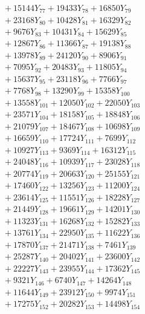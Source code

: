 \documentclass[a4paper,10pt]{article}
\begin{document}
{\begin{align}
&\;  + 15144 Y_{77} + 19433 Y_{78} + 16850 Y_{79} \\[0.3ex]
&\;  + 23168 Y_{80} + 10428 Y_{81} + 16329 Y_{82} \\[0.3ex]
&\;  + 9676 Y_{83} + 10431 Y_{84} + 15629 Y_{85} \\[0.3ex]
&\;  + 12867 Y_{86} + 11366 Y_{87} + 19138 Y_{88} \\[0.5ex]\allowbreak
&\;  + 13978 Y_{89} + 24120 Y_{90} + 8906 Y_{91} \\[0.3ex]
&\;  + 7095 Y_{92} + 20483 Y_{93} + 11805 Y_{94} \\[0.3ex]
&\;  + 15637 Y_{95} + 23118 Y_{96} + 7766 Y_{97} \\[0.3ex]
&\;  + 7768 Y_{98} + 13290 Y_{99} + 15358 Y_{100} \\[0.3ex]
&\;  + 13558 Y_{101} + 12050 Y_{102} + 22050 Y_{103} \\[0.3ex]
&\;  + 23571 Y_{104} + 18158 Y_{105} + 18848 Y_{106} \\[0.3ex]
&\;  + 21079 Y_{107} + 18467 Y_{108} + 10698 Y_{109} \\[0.3ex]
&\;  + 16659 Y_{110} + 17724 Y_{111} + 7699 Y_{112} \\[0.3ex]
&\;  + 10927 Y_{113} + 9369 Y_{114} + 16312 Y_{115} \\[0.3ex]
&\;  + 24048 Y_{116} + 10939 Y_{117} + 23028 Y_{118} \\[0.5ex]\allowbreak
&\;  + 20774 Y_{119} + 20663 Y_{120} + 25155 Y_{121} \\[0.3ex]
&\;  + 17460 Y_{122} + 13256 Y_{123} + 11200 Y_{124} \\[0.3ex]
&\;  + 23614 Y_{125} + 11551 Y_{126} + 18228 Y_{127} \\[0.3ex]
&\;  + 21449 Y_{128} + 19661 Y_{129} + 14201 Y_{130} \\[0.3ex]
&\;  + 11323 Y_{131} + 16268 Y_{132} + 15282 Y_{133} \\[0.3ex]
&\;  + 13761 Y_{134} + 22950 Y_{135} + 11622 Y_{136} \\[0.3ex]
&\;  + 17870 Y_{137} + 21471 Y_{138} + 7461 Y_{139} \\[0.3ex]
&\;  + 25287 Y_{140} + 20402 Y_{141} + 23600 Y_{142} \\[0.3ex]
&\;  + 22227 Y_{143} + 23955 Y_{144} + 17362 Y_{145} \\[0.3ex]
&\;  + 9321 Y_{146} + 6740 Y_{147} + 14264 Y_{148} \\[0.5ex]\allowbreak
&\;  + 11644 Y_{149} + 23912 Y_{150} + 9974 Y_{151} \\[0.3ex]
&\;  + 17275 Y_{152} + 20282 Y_{153} + 14498 Y_{154} \\[0.3ex]

\end{align}}
\end{document}
